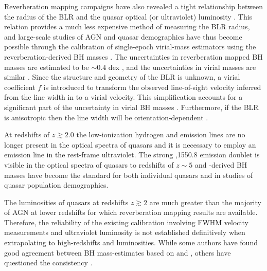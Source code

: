 Reverberation mapping campaigns have also revealed a tight relationship between the radius of the BLR and the quasar optical (or ultraviolet) luminosity \citep[the $R-L$ relation; e.g.][]{kaspi00,kaspi07}.
This relation provides a much less expensive method of measuring the BLR radius, and large-scale studies of AGN and quasar demographics have thus become possible through the calibration of single-epoch virial-mass estimators using the reverberation-derived BH masses \citep[e.g.][]{greene05,vestergaard06,vestergaard09,shen11,shen12,trakhtenbrot12}.
The uncertainties in reverberation mapped BH masses are estimated to be $\sim 0.4$ dex \citep[e.g.][]{peterson10}, and the uncertainties in virial masses are similar \citep[e.g.][]{vestergaard06}.
Since the structure and geometry of the BLR is unknown, a virial coefficient $f$ is introduced to transform the observed line-of-sight velocity inferred from the line width in to a virial velocity.
This simplification accounts for a significant part of the uncertainty in virial BH masses \citep[in addition to, for example, describing the BLR with a single radius $R$ and scatter in the $R-L$ relation;][]{shen13}. 
Furthermore, if the BLR is anisotropic \citep[for example, in a flattened disk; e.g.][]{jarvis06} then the line width will be orientation-dependent \citep[e.g.][]{runnoe13b,shen14,brotherton15}. 

At redshifts of $z\gtrsim 2.0$ the low-ionization hydrogen and  emission lines are no longer present in the optical spectra of quasars and it is necessary to employ an emission line in the rest-frame ultraviolet.  
The strong ,1550.8 emission doublet is visible in the optical spectra of quasars to redshifts of $z\sim5$ and -derived BH masses have become the standard \citep[e.g.][]{vestergaard06,park13} for both individual quasars and in studies of quasar population demographics.

The luminosities of quasars at redshifts $z\gtrsim 2$ are much greater than the majority of AGN at lower redshifts for which reverberation mapping results are available.  
Therefore, the reliability of the existing calibration involving  FWHM velocity measurements and ultraviolet luminosity is not established definitively when extrapolating to high-redshifts and luminosities. 
While some authors have found good agreement between BH mass-estimates based on  and \hb \citep[e.g.][]{vestergaard06, assef11, tilton13}, others have questioned the consistency \citep[e.g.][]{baskin05,trakhtenbrot12,shen12}.  

